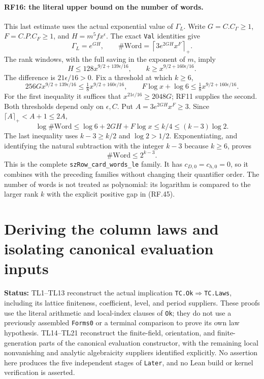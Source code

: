 \documentclass[11pt,a4paper]{article}
\numberwithin{equation}{section}
\theoremstyle{remark}\newtheorem{remark}[theorem]{Remark}
\newcommand{\status}[1]{\textbf{Status:} #1}
\begin{document}
\paragraph{RF16: the literal upper bound on the number of words.}
This last estimate uses the actual exponential value of $\Gamma_L$.
Write $G=C.C_\Gamma\geq1$, $F=C.P.C_F\geq1$, and
$H=m^5f x^\epsilon$. The exact \texttt{Val} identities give
\[
 \Gamma_L=e^{GH},\qquad
 \#\mathrm{Word}=\left\lceil3e^{2GH}x^F\right\rceil_+.
                                                               \tag{RF.44}
\]
The rank windows, with the full saving in the exponent of $m$, imply
\[
 H\leq128x^{9/2+139\epsilon/16},\qquad
 k\geq x^{9/2+160\epsilon/16}.                              \tag{RF.45}
\]
The difference is $21\epsilon/16>0$. Fix a threshold at which
$k\geq6$,
\[
 256Gx^{9/2+139\epsilon/16}
                  \leq\tfrac18x^{9/2+160\epsilon/16},
 \qquad F\log x+\log6
                  \leq\tfrac18x^{9/2+160\epsilon/16}.        \tag{RF.46}
\]
For the first inequality it suffices that
$x^{21\epsilon/16}\geq2048G$; RF11 supplies the second.
Both thresholds depend only on $\epsilon,C$.
Put $A=3e^{2GH}x^F\geq3$. Since
$\lceil A\rceil_+<A+1\leq2A$,
\[
 \log\#\mathrm{Word}
       \leq\log6+2GH+F\log x\leq k/4
       \leq(k-3)\log2.                                     \tag{RF.47}
\]
The last inequality uses $k-3\geq k/2$ and $\log2>1/2$.
Exponentiating, and identifying the natural subtraction with the
integer $k-3$ because $k\geq6$, proves
\[
                         \#\mathrm{Word}\leq2^{k-3}.         \tag{RF.48}
\]
This is the complete \texttt{szRow\_\allowbreak card\_\allowbreak words\_\allowbreak le} family.
It has $c_{D,0}=c_{h,0}=0$, so it combines with the preceding
families without changing their quantifier order. The number of words
is not treated as polynomial: its logarithm is compared to the
larger rank $k$ with the explicit positive gap in (RF.45).


\section{Deriving the column laws and isolating canonical evaluation inputs}
\label{sec:column-laws}

\status{TL1--TL13 reconstruct the actual implication
\texttt{TC.Ok}$\Rightarrow$\texttt{TC.Laws}, including its lattice
finiteness, coefficient, level, and period suppliers. These proofs use the
literal arithmetic and local-index clauses of \texttt{Ok}; they do not
use a previously assembled \texttt{Forms0} or a terminal comparison to
prove its own law hypothesis. TL14--TL21 reconstruct the finite-field,
orientation, and finite-generation parts of the canonical evaluation
constructor, with the remaining local nonvanishing and analytic
algebraicity suppliers identified explicitly. No assertion here produces
the five independent stages of \texttt{Later}, and no Lean build or
kernel verification is asserted.}
\end{document}
